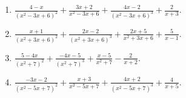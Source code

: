 \documentclass[11pt,oneside]{book}
\begin{document}
\begin{enumerate}[leftmargin=*,label=\textbf{X\arabic*.},itemsep=0.45\baselineskip]
\item $\displaystyle \frac{4 - x}{\left(x^{2} - 3 x + 6\right)^{2}} + \frac{3 x + 2}{x^{2} - 3 x + 6} + \frac{4 x - 2}{\left(x^{2} - 3 x + 6\right)^{3}} + \frac{2}{x + 3}$.
\item $\displaystyle \frac{x + 1}{\left(x^{2} + 3 x + 6\right)^{2}} + \frac{2 x - 2}{\left(x^{2} + 3 x + 6\right)^{3}} + \frac{2 x + 5}{x^{2} + 3 x + 6} + \frac{5}{x - 1}$.
\item $\displaystyle \frac{5 - 4 x}{\left(x^{2} + 7\right)^{2}} + \frac{- 4 x - 5}{\left(x^{2} + 7\right)^{3}} + \frac{x - 5}{x^{2} + 7} - \frac{2}{x + 2}$.
\item $\displaystyle \frac{- 3 x - 2}{\left(x^{2} - 5 x + 7\right)^{2}} + \frac{x + 3}{x^{2} - 5 x + 7} + \frac{4 x + 2}{\left(x^{2} - 5 x + 7\right)^{3}} + \frac{4}{x + 5}$.
\end{enumerate}
\end{document}
